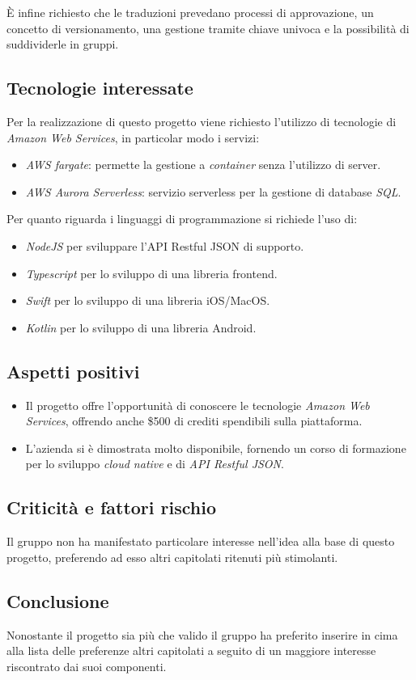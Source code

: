 È infine richiesto che le traduzioni prevedano processi di approvazione, un concetto di versionamento, una gestione tramite chiave univoca e la possibilità di suddividerle in gruppi.

\subsection{Tecnologie interessate}
Per la realizzazione di questo progetto viene richiesto l’utilizzo di tecnologie di \textit{Amazon Web Services}, in particolar modo i servizi:
\begin{itemize}
    \item \textit{AWS fargate}: permette la gestione a \textit{container} senza l’utilizzo di server.
    \item \textit{AWS Aurora Serverless}: servizio serverless per la gestione di database \textit{SQL}.
\end{itemize}
Per quanto riguarda i linguaggi di programmazione si richiede l’uso di:
\begin{itemize}
    \item \textit{NodeJS} per sviluppare l’API Restful JSON di supporto.
    \item \textit{Typescript} per lo sviluppo di una libreria frontend.
    \item \textit{Swift} per lo sviluppo di una libreria iOS/MacOS.
    \item \textit{Kotlin} per lo sviluppo di una libreria Android.
\end{itemize}
\subsection{Aspetti positivi}
\begin{itemize}
    \item Il progetto offre l'opportunità di conoscere le tecnologie \textit{Amazon Web Services}, offrendo anche \$500 di crediti spendibili sulla piattaforma.
    \item L’azienda si è dimostrata molto disponibile, fornendo un corso di formazione per lo sviluppo \textit{cloud native} e di \textit{API Restful JSON}.
\end{itemize}

\subsection{Criticità e fattori rischio}
Il gruppo non ha manifestato particolare interesse nell’idea alla base di questo progetto, preferendo ad esso altri capitolati ritenuti più stimolanti.

\subsection{Conclusione}
Nonostante il progetto sia più che valido il gruppo ha preferito inserire in cima alla lista delle preferenze altri capitolati a seguito di un maggiore interesse riscontrato dai suoi componenti.

